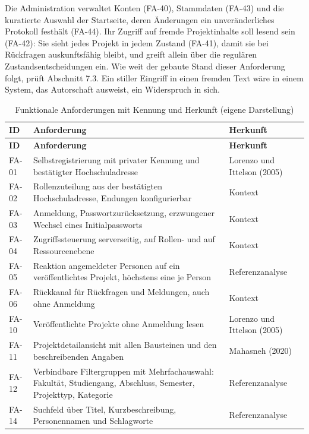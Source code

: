 Die Administration verwaltet Konten (FA-40), Stammdaten (FA-43) und die kuratierte Auswahl der Startseite, deren Änderungen ein unveränderliches Protokoll festhält (FA-44). Ihr Zugriff auf fremde Projektinhalte soll lesend sein (FA-42): Sie sieht jedes Projekt in jedem Zustand (FA-41), damit sie bei Rückfragen auskunftsfähig bleibt, und greift allein über die regulären Zustandsentscheidungen ein. Wie weit der gebaute Stand dieser Anforderung folgt, prüft Abschnitt 7.3. Ein stiller Eingriff in einen fremden Text wäre in einem System, das Autorschaft ausweist, ein Widerspruch in sich.

\begingroup
\small
\setlength{\tabcolsep}{4pt}
\setlength{\LTcapwidth}{\textwidth}
\begin{longtable}{@{}L{1.5cm}L{9.2cm}L{3.8cm}@{}}
	\caption[Funktionale Anforderungen mit Kennung und Herkunft]{Funktionale Anforderungen mit Kennung und Herkunft (eigene Darstellung)}
	\label{tab:fa}\\
	\toprule
	\textbf{ID} & \textbf{Anforderung} & \textbf{Herkunft} \\
	\midrule
	\endfirsthead
	\toprule
	\textbf{ID} & \textbf{Anforderung} & \textbf{Herkunft} \\
	\midrule
	\endhead
	\bottomrule
	\endfoot
	FA-01 & Selbstregistrierung mit privater Kennung und bestätigter Hochschuladresse & Lorenzo und Ittelson (2005) \\
	FA-02 & Rollenzuteilung aus der bestätigten Hochschuladresse, Endungen konfigurierbar & Kontext \\
	FA-03 & Anmeldung, Passwortzurücksetzung, erzwungener Wechsel eines Initialpassworts & Kontext \\
	FA-04 & Zugriffssteuerung serverseitig, auf Rollen- und auf Ressourcenebene & Kontext \\
	FA-05 & Reaktion angemeldeter Personen auf ein veröffentlichtes Projekt, höchstens eine je Person & Referenzanalyse \\
	FA-06 & Rückkanal für Rückfragen und Meldungen, auch ohne Anmeldung & Kontext \\
	FA-10 & Veröffentlichte Projekte ohne Anmeldung lesen & Lorenzo und Ittelson (2005) \\
	FA-11 & Projektdetailansicht mit allen Bausteinen und den beschreibenden Angaben & Mahasneh (2020) \\
	FA-12 & Verbindbare Filtergruppen mit Mehrfachauswahl: Fakultät, Studiengang, Abschluss, Semester, Projekttyp, Kategorie & Referenzanalyse \\
	FA-14 & Suchfeld über Titel, Kurzbeschreibung, Personennamen und Schlagworte & Referenzanalyse \\

\end{longtable}
